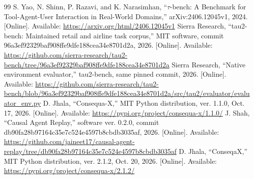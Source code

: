 \documentclass[conference]{IEEEtran}
\begin{document}
\begin{thebibliography}{99}
S. Yao, N. Shinn, P. Razavi, and K. Narasimhan, ``$\tau$-bench: A Benchmark for Tool-Agent-User Interaction in Real-World Domains,'' arXiv:2406.12045v1, 2024. [Online]. Available: \url{https://arxiv.org/html/2406.12045v1}
Sierra Research, ``tau2-bench: Maintained retail and airline task corpus,''
MIT software, commit 96a3ef92329baf908ffe9dfe188cea34e8701d2a, 2026.
[Online]. Available:
\url{https://github.com/sierra-research/tau2-bench/tree/96a3ef92329baf908ffe9dfe188cea34e8701d2a}
Sierra Research, ``Native environment evaluator,'' tau2-bench, same pinned
commit, 2026. [Online]. Available:
\url{https://github.com/sierra-research/tau2-bench/blob/96a3ef92329baf908ffe9dfe188cea34e8701d2a/src/tau2/evaluator/evaluator_env.py}
 D. Jhala, ``Consequa-X,'' MIT Python distribution,
ver. 1.1.0, Oct. 17, 2026. [Online]. Available:
\url{https://pypi.org/project/consequa-x/1.1.0/}
J. Shah, ``Causal Agent Replay,'' software ver. 0.2.0, commit
db90fa28b97164c35e7c524e4597b8cbdb3035af, 2026. [Online]. Available:
\url{https://github.com/jaineet17/causal-agent-replay/tree/db90fa28b97164c35e7c524e4597b8cbdb3035af}
 D. Jhala, ``ConseqaX,'' MIT Python distribution,
ver. 2.1.2, Oct. 20, 2026. [Online]. Available:
\url{https://pypi.org/project/consequa-x/2.1.2/}
\end{thebibliography}
\end{document}
